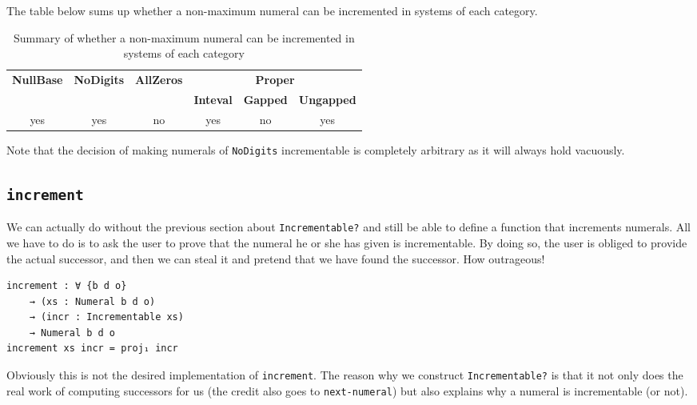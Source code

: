 \documentclass[\main/thesis.tex]{subfiles}
\begin{document}
The table below sums up whether a non-maximum numeral can be incremented in
systems of each category.

\begin{table}[H]
    \centering
    \begin{adjustbox}{max width=\textwidth}
    \begin{tabular}{|c|c|c|c|c|c|}
        \hline
        \multirow{2}{*}{\textbf{NullBase}} &
        \multirow{2}{*}{\textbf{NoDigits}} &
        \multirow{2}{*}{\textbf{AllZeros}} &
        \multicolumn{3}{c|}{\textbf{Proper}} \\
        \cline{4 - 6}
        & & & \textbf{Inteval} & \textbf{Gapped} & \textbf{Ungapped} \\
        \hline
        yes & yes & no & yes & no & yes \\
        \hline
    \end{tabular}
    \end{adjustbox}
\caption{Summary of whether a non-maximum numeral can be incremented in
systems of each category}
\label{table:12}
\end{table}


Note that the decision of making numerals of \lstinline{NoDigits} incrementable
is completely arbitrary as it will always hold vacuously.

\subsection{\lstinline|increment|}

We can actually do without the previous section about \lstinline|Incrementable?|
and still be able to define a function that increments numerals.
All we have to do is to ask the user to prove that the numeral he or she has
given is incrementable.
By doing so, the user is obliged to provide the actual successor,
and then we can steal it and pretend that we have found the successor.
How outrageous!

\begin{lstlisting}
increment : ∀ {b d o}
    → (xs : Numeral b d o)
    → (incr : Incrementable xs)
    → Numeral b d o
increment xs incr = proj₁ incr
\end{lstlisting}

Obviously this is not the desired implementation of \lstinline|increment|.
The reason why we construct \lstinline|Incrementable?| is that it not only
does the real work of computing successors for us (the credit also goes to \lstinline|next-numeral|)
but also explains why a numeral is incrementable (or not).
\end{document}
